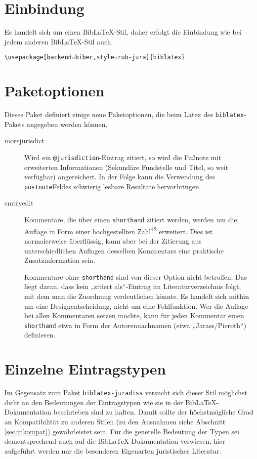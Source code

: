 \documentclass[11pt,a4paper,DIV=calc]{scrartcl}
\newcommand\software[1]{\textsf{#1}}
\newcommand\Biblatex{\software{Bib\LaTeX{}}\xspace}
\begin{document}
\section{Einbindung}

Es handelt sich um einen \Biblatex-Stil, daher erfolgt die Einbindung
wie bei jedem anderen \Biblatex-Stil auch.

\begin{verbatim}
\usepackage[backend=biber,style=rub-jura]{biblatex}
\end{verbatim}

\section{Paketoptionen}

Dieses Paket definiert einige neue Paketoptionen, die beim Latex des
\verb+biblatex+-Pakets angegeben werden können.

\begin{description}
\item[morejurisdict] Wird ein \verb+@jurisdiction+-Eintrag zitiert, so
  wird die Fußnote mit erweiterten Informationen (Sekundäre Fundstelle
  und Titel, so weit verfügbar) angereichert. In der Folge kann die
  Verwendung des \verb+postnote+Feldes schwierig lesbare Resultate
  hervorbringen.
\item[cmtryedit] Kommentare, die über einen \verb+shorthand+ zitiert
  werden, werden um die Auflage in Form einer hochgestellten
  Zahl\textsuperscript{42} erweitert. Dies ist normalerweise
  überflüssig, kann aber bei der Zitierung aus unterschiedlichen
  Auflagen desselben Kommentars eine praktische Zusatzinformation
  sein.

  Kommentare ohne \verb+shorthand+ sind von dieser Option nicht
  betroffen. Das liegt daran, dass kein „zitiert als“-Eintrag im
  Literaturverzeichnis folgt, mit dem man die Zuordnung verdeutlichen
  könnte. Es handelt sich mithin um eine Designentscheidung, nicht um
  eine Fehlfunktion. Wer die Auflage bei allen Kommentaren setzen
  möchte, kann für jeden Kommentar einen \verb+shorthand+ etwa in Form
  der Autorennachnamen (etwa „Jarass/Pieroth“) definieren.
\end{description}

\section{Einzelne Eintragstypen}\label{sec:eintragstypen}

Im Gegensatz zum Paket \verb+biblatex-juradiss+ versucht sich dieser
Stil möglichst dicht an den Bedeutungen der Eintragstypen wie sie in
der \Biblatex-Do\-ku\-men\-ta\-tion beschrieben sind zu halten. Damit sollte
der höchstmögliche Grad an Kompatibilität zu anderen Stilen (zu den
Ausnahmen siehe Abschnitt \ref{sec:inkompat}) gewährleistet sein. Für
die generelle Bedeutung der Typen sei dementsprechend auch auf die
\Biblatex-Do\-ku\-men\-ta\-tion verwiesen, hier aufgeführt werden nur die
besonderen Eigenarten juristischer Literatur.
\end{document}
